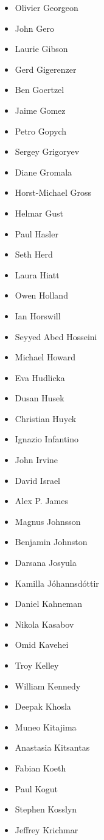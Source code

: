 \documentclass[10pt,fleqn,openany]{book} %
\begin{document}
\begin{multicols}{2}
\begin{itemize}
			\item Olivier Georgeon
			\item John Gero
			\item Laurie Gibson
			\item Gerd Gigerenzer
			\item Ben Goertzel
			\item Jaime Gomez
			\item Petro Gopych
			\item Sergey Grigoryev
			\item Diane Gromala
			\item Horst-Michael Gross
			\item Helmar Gust
			\item Paul Hasler
			\item Seth Herd
			\item Laura Hiatt
			\item Owen Holland
			\item Ian Horswill
			\item Seyyed Abed Hosseini
			\item Michael Howard
			\item Eva Hudlicka
			\item Dusan Husek
			\item Christian Huyck
			\item Ignazio Infantino
			\item John Irvine
			\item David Israel
			\item Alex P. James
			\item Magnus Johnsson
			\item Benjamin Johnston
			\item Darsana Josyula
			\item Kamilla Jóhannsdóttir
			\item Daniel Kahneman
			\item Nikola Kasabov
			\item Omid Kavehei
			\item Troy Kelley
			\item William Kennedy
			\item Deepak Khosla
			\item Muneo Kitajima
			\item Anastasia Kitsantas
			\item Fabian Koeth
			\item Paul Kogut
			\item Stephen Kosslyn
			\item Jeffrey Krichmar

\end{itemize}
\end{multicols}
\end{document}
